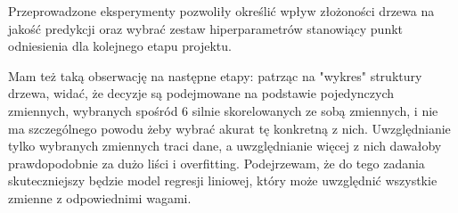 \documentclass[a4paper,10pt]{article}
\begin{document}
Przeprowadzone eksperymenty pozwoliły określić wpływ złożoności drzewa na jakość predykcji oraz wybrać zestaw hiperparametrów stanowiący punkt odniesienia dla kolejnego etapu projektu.

Mam też taką obserwację na następne etapy: patrząc na "wykres" struktury drzewa, widać, że decyzje są podejmowane na podstawie pojedynczych zmiennych,
wybranych spośród 6 silnie skorelowanych ze sobą zmiennych, i nie ma szczególnego powodu żeby wybrać akurat tę konkretną z nich.
Uwzględnianie tylko wybranych zmiennych traci dane, a uwzględnianie więcej z nich dawałoby prawdopodobnie za dużo liści i overfitting.
Podejrzewam, że do tego zadania skuteczniejszy będzie model regresji liniowej, który może uwzględnić wszystkie zmienne z odpowiednimi wagami.

\end{document}
